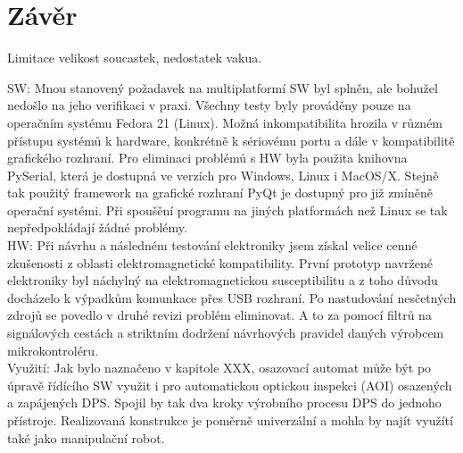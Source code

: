 \chapter{Závěr}

Limitace velikost soucastek, nedostatek vakua. 



SW:
Mnou stanovený požadavek na multiplatformí SW byl splněn, ale bohužel nedošlo na jeho verifikaci v praxi. Všechny testy byly prováděny pouze na operačním systému Fedora 21 (Linux).  Možná inkompatibilita hrozila v různém přístupu systémů k hardware, konkrétně k sériovému portu a dále v kompatibilitě grafického rozhraní. Pro eliminaci problémů s HW byla použita knihovna PySerial, která je dostupná ve verzích pro Windows, Linux i MacOS/X. Stejně tak použitý framework na grafické rozhraní PyQt je dostupný pro již zmíněně operační systémi.
Při spoušění programu na jiných platformách než Linux se tak nepředpokládají žádné problémy.
\\

HW:
Při návrhu a následném testování elektroniky jsem získal velice cenné zkušenosti z oblasti elektromagnetické kompatibility. První prototyp navržené elektroniky byl náchylný na elektromagnetickou susceptibilitu a z toho důvodu docházelo k výpadkům komunkace přes USB rozhraní. Po nastudování nesčetných zdrojů se povedlo v druhé revizi problém eliminovat. A to za pomocí filtrů na signálových cestách a striktním dodržení návrhových pravidel daných výrobcem mikrokontroléru.
\\

Využití:
Jak bylo naznačeno v kapitole XXX, osazovací automat může být po úpravě řídícího SW využit i pro automatickou optickou inspekci (AOI) osazených a zapájených DPS. Spojil by tak dva kroky výrobního procesu DPS do jednoho přístroje.
Realizovaná konstrukce je poměrně univerzální a mohla by najít využítí také jako manipulační robot.
